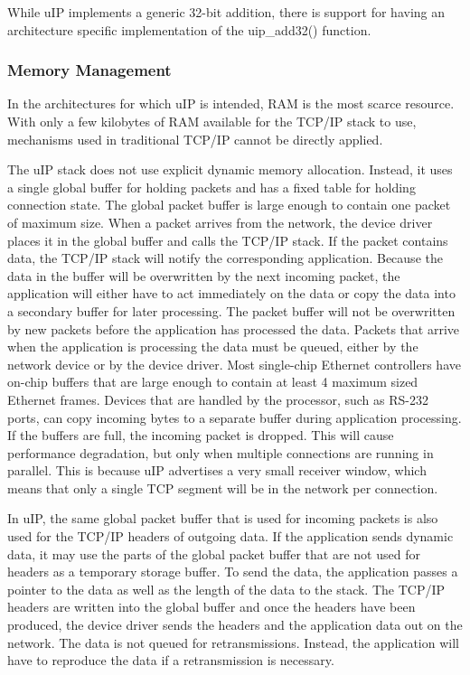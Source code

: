 \-While u\-I\-P implements a generic 32-\/bit addition, there is support for having an architecture specific implementation of the uip\-\_\-add32() function.\hypertarget{a00060_memory}{}\subsubsection{\-Memory Management}\label{a00060_memory}
\-In the architectures for which u\-I\-P is intended, \-R\-A\-M is the most scarce resource. \-With only a few kilobytes of \-R\-A\-M available for the \-T\-C\-P/\-I\-P stack to use, mechanisms used in traditional \-T\-C\-P/\-I\-P cannot be directly applied.

\-The u\-I\-P stack does not use explicit dynamic memory allocation. \-Instead, it uses a single global buffer for holding packets and has a fixed table for holding connection state. \-The global packet buffer is large enough to contain one packet of maximum size. \-When a packet arrives from the network, the device driver places it in the global buffer and calls the \-T\-C\-P/\-I\-P stack. \-If the packet contains data, the \-T\-C\-P/\-I\-P stack will notify the corresponding application. \-Because the data in the buffer will be overwritten by the next incoming packet, the application will either have to act immediately on the data or copy the data into a secondary buffer for later processing. \-The packet buffer will not be overwritten by new packets before the application has processed the data. \-Packets that arrive when the application is processing the data must be queued, either by the network device or by the device driver. \-Most single-\/chip \-Ethernet controllers have on-\/chip buffers that are large enough to contain at least 4 maximum sized \-Ethernet frames. \-Devices that are handled by the processor, such as \-R\-S-\/232 ports, can copy incoming bytes to a separate buffer during application processing. \-If the buffers are full, the incoming packet is dropped. \-This will cause performance degradation, but only when multiple connections are running in parallel. \-This is because u\-I\-P advertises a very small receiver window, which means that only a single \-T\-C\-P segment will be in the network per connection.

\-In u\-I\-P, the same global packet buffer that is used for incoming packets is also used for the \-T\-C\-P/\-I\-P headers of outgoing data. \-If the application sends dynamic data, it may use the parts of the global packet buffer that are not used for headers as a temporary storage buffer. \-To send the data, the application passes a pointer to the data as well as the length of the data to the stack. \-The \-T\-C\-P/\-I\-P headers are written into the global buffer and once the headers have been produced, the device driver sends the headers and the application data out on the network. \-The data is not queued for retransmissions. \-Instead, the application will have to reproduce the data if a retransmission is necessary.

